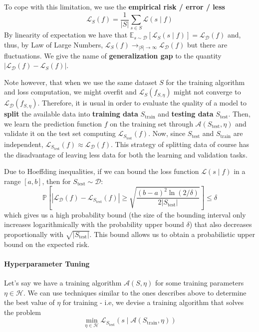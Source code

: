 \documentclass{article}
\newcommand{\prob}{\mathbb{P}}
\newcommand{\E}{\mathbb{E}}
\newcommand{\loss}{\mathcal{L}}
\newcommand{\dist}{\mathcal{D}}
\begin{document}
To cope with this limitation, we use the \textbf{empirical risk / error / less}
$$
\loss_S(f) = \frac{1}{|S|} \sum_{s \in S} \loss(s \mid f)
$$
By linearity of expectation we have that $\E_{s \sim \dist}\left[\loss_S(s \mid f)\right] = \loss_\dist(f)$ and, thus, by Law of Large Numbers, $\loss_S(f) \to_{|S| \to \infty} \loss_\dist(f)$ but there are fluctuations.
We give the name of \textbf{generalization gap} to the quantity $|\loss_\dist(f) - \loss_S(f)|$.

Note however, that when we use the same dataset $S$ for the training algorithm and loss computation, we might overfit and $\loss_S(f_{S, \eta})$ might not converge to $\loss_\dist(f_{S, \eta})$.
Therefore, it is usual in order to evaluate the quality of a model to \textbf{split} the available data into \textbf{training data} $S_{\text{train}}$ and \textbf{testing data} $S_{\text{test}}$.
Then, we learn the prediction function $f$ on the training set through $\mathcal{A}(S_{\text{test}}, \eta)$ and validate it on the test set computing $\loss_{S_{\text{test}}}(f)$.
Now, since $S_{\text{test}}$ and $S_{\text{train}}$ are independent, $\loss_{S_{\text{test}}}(f) \approx \loss_\dist(f)$.
This strategy of splitting data of course has the disadvantage of leaving less data for both the learning and validation tasks.

Due to Hoeffding inequalities, if we can bound the loss function $\loss(s \mid f)$ in a range $[a, b]$, then for $S_{\text{test}} \sim \dist$:
$$
\prob \left[
    | \loss_\dist(f) - \loss_{S_{\text{test}}}(f) | \geq
    \sqrt{\frac{(b-a)^2 \ln(2/\delta)}{2|S_{\text{test}}|}}
\right] \leq \delta
$$
which gives us a high probability bound (the size of the bounding interval only increases logarithmically with the probability upper bound $\delta$) that also decreases proportionally with $\sqrt{|S_{\text{test}}|}$.
This bound allows us to obtain a probabilistic upper bound on the expected risk.

\paragraph{Hyperparameter Tuning}

Let's say we have a training algorithm $\mathcal{A}(S, \eta)$ for some training parameters $\eta \in \mathcal{H}$.
We can use techniques similar to the ones describes above to determine the best value of $\eta$ for training - i.e, we devise a training algorithm that solves the problem
$$
\min_{\eta \in \mathcal{H}} \loss_{S_{\text{test}}} (s \mid \mathcal{A}(S_{\text{train}}, \eta))
$$
\end{document}
